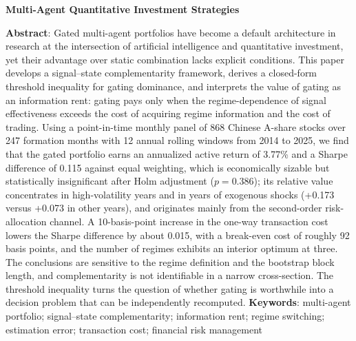 \documentclass[UTF8,a4paper,zihao=-4]{ctexart}
\theoremstyle{plain}
\theoremstyle{definition}
\theoremstyle{remark}
\begin{document}
\vspace{0.8em}
{\raggedright\small
\noindent\textbf{Multi-Agent Quantitative Investment Strategies}\par

\vspace{0.3em}
\noindent\textbf{Abstract}: Gated multi-agent portfolios have become a default architecture
in research at the intersection of artificial intelligence and quantitative investment,
yet their advantage over static combination lacks explicit conditions. This paper develops
a signal--state complementarity framework, derives a closed-form threshold inequality for
gating dominance, and interprets the value of gating as an information rent: gating pays
only when the regime-dependence of signal effectiveness exceeds the cost of acquiring
regime information and the cost of trading. Using a point-in-time monthly panel of 868
Chinese A-share stocks over 247 formation months with 12 annual rolling windows from 2014
to 2025, we
find that the gated portfolio earns an annualized active return of 3.77\% and a Sharpe
difference of 0.115 against equal weighting, which is economically sizable but
statistically insignificant after Holm adjustment ($p=0.386$); its relative value
concentrates in high-volatility years and in years of exogenous shocks (+0.173 versus
+0.073 in other years), and originates mainly from the second-order risk-allocation
channel. A 10-basis-point increase in the one-way
transaction cost lowers the Sharpe difference by about 0.015, with a break-even cost of
roughly 92 basis points, and the number of regimes exhibits an interior optimum at
three. The conclusions are sensitive to the regime definition and the bootstrap block
length, and complementarity is not identifiable in a narrow cross-section. The
threshold inequality turns the question of whether gating is worthwhile into a decision
problem that can be independently recomputed.
\vspace{0.3em}
\noindent\textbf{Keywords}: multi-agent portfolio; signal--state complementarity;
information rent; regime switching; estimation error; transaction cost;
financial risk management\par
}

\setcounter{page}{1}












\end{document}
